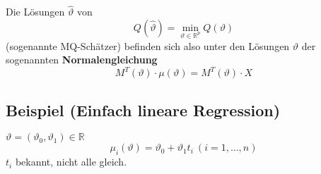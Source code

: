 \documentclass[a4paper,11pt,twoside,titlepage]{article}
\newcommand{\R}{{\mathbb R}}
\begin{document}
Die Lösungen $\hat\vartheta$ von \[Q(\hat\vartheta)=\min_{\vartheta\in\R^p}Q(\vartheta)\] (sogenannte MQ-Schätzer) befinden sich also unter den Lösungen $\vartheta$ der sogenannten \textbf{Normalengleichung}
\[M^T(\vartheta)\cdot\mu(\vartheta)=M^T(\vartheta)\cdot X\]

\subsection{Beispiel (Einfach lineare Regression)}
$\vartheta=(\vartheta_0,\vartheta_1)\in\R$
\[\mu_i(\vartheta )=\vartheta_0+\vartheta_1t_i\ (i=1,\ldots ,n)\]
$t_i$ bekannt, nicht alle gleich.
 
\end{document}
